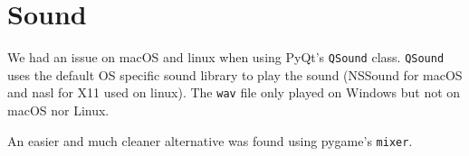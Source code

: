 \section{Sound}\label{sec:sound}

We had an issue on macOS and linux when using PyQt's \texttt{QSound} class.
\texttt{QSound} uses the default OS specific sound library to play the sound
(NSSound for macOS and \gls{nasl} for X11 used on linux). The \texttt{wav} file
only played on Windows but not on macOS nor Linux.

An easier and much cleaner alternative was found using pygame's \texttt{mixer}.

